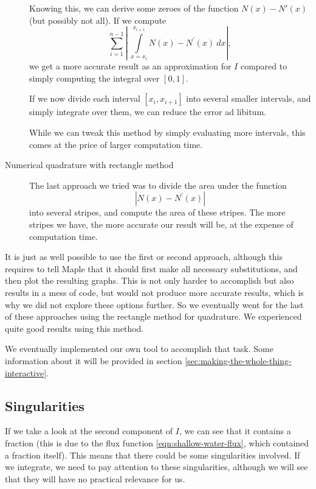\documentclass{article}
\begin{document}
\begin{description}
  Knowing this, we can derive some zeroes of the function $N(x)-N'(x)$ (but possibly not all). If we compute
  \begin{equation*}
    \sum\limits_{i=1}^{n-1} \left|\ \int\limits_{x=x_i}^{x_{i+1}} N\left(x\right) - N^\prime\left(x\right)\ dx \right|,
  \end{equation*}
  we get a more accurate result as an approximation for $I$ compared to simply computing the integral over $[0,1]$.

  If we now divide each interval $[x_i,x_{i+1}]$ into several smaller intervals, and simply integrate over them, we can reduce the error ad libitum.

  While we can tweak this method by simply evaluating more intervals, this comes at the price of larger computation time.
\item[Numerical quadrature with rectangle method] The last approach we tried was to divide the area under the function
  \begin{equation*}
    \left| N\left(x\right)-N^\prime\left(x\right) \right|
  \end{equation*}
  into several stripes, and compute the area of these stripes. The more stripes we have, the more accurate our result will be, at the expense of computation time.
\end{description}

It is just as well possible to use the first or second approach, although this requires to tell Maple that it should first make all necessary substitutions, and then plot the resulting graphs. This is not only harder to accomplish but also results in a mess of code, but would not produce more accurate results, which is why we did not explore these options further. So we eventually went for the last of these approaches using the rectangle method for quadrature. We experienced quite good results using this method.

We eventually implemented our own tool to accomplish that task.
Some information about it will be provided in section \ref{sec:making-the-whole-thing-interactive}.

\subsection{Singularities}
\label{sec:singularities}

If we take a look at the second component of $I$, we can see that it contains a fraction (this is due to the flux function \ref{eqn:shallow-water-flux}, which contained a fraction itself). This means that there could be some singularities involved. If we integrate, we need to pay attention to these singularities, although we will see that they will have no practical relevance for us.
\end{document}

